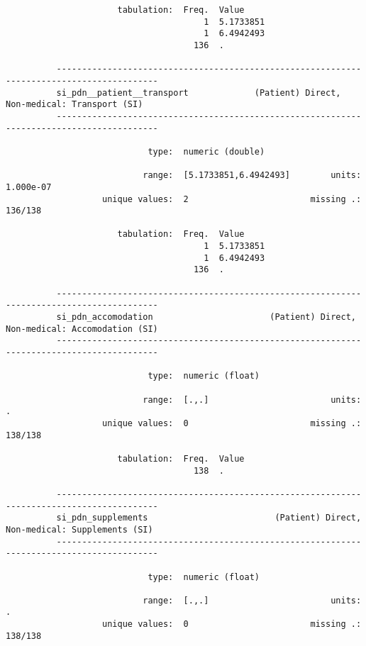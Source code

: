 \documentclass{article}
\begin{document}
\begin{verbatim}
                      tabulation:  Freq.  Value
                                       1  5.1733851
                                       1  6.4942493
                                     136  .
          
          ------------------------------------------------------------------------------------------
          si_pdn__patient__transport             (Patient) Direct, Non-medical: Transport (SI)
          ------------------------------------------------------------------------------------------
          
                            type:  numeric (double)
          
                           range:  [5.1733851,6.4942493]        units:  1.000e-07
                   unique values:  2                        missing .:  136/138
          
                      tabulation:  Freq.  Value
                                       1  5.1733851
                                       1  6.4942493
                                     136  .
          
          ------------------------------------------------------------------------------------------
          si_pdn_accomodation                       (Patient) Direct, Non-medical: Accomodation (SI)
          ------------------------------------------------------------------------------------------
          
                            type:  numeric (float)
          
                           range:  [.,.]                        units:  .
                   unique values:  0                        missing .:  138/138
          
                      tabulation:  Freq.  Value
                                     138  .
          
          ------------------------------------------------------------------------------------------
          si_pdn_supplements                         (Patient) Direct, Non-medical: Supplements (SI)
          ------------------------------------------------------------------------------------------
          
                            type:  numeric (float)
          
                           range:  [.,.]                        units:  .
                   unique values:  0                        missing .:  138/138
          

\end{verbatim}
\end{document}
